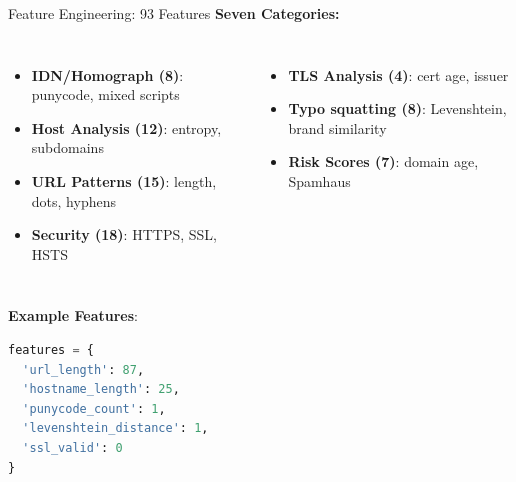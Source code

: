 \documentclass[10pt, aspectratio=169]{beamer}
\begin{document}
\begin{frame}{Feature Engineering: 93 Features}
    \textbf{Seven Categories:}
    \begin{columns}[T]
        \begin{itemize}
            \item \textbf{IDN/Homograph (8)}: punycode, mixed scripts
            \item \textbf{Host Analysis (12)}: entropy, subdomains
            \item \textbf{URL Patterns (15)}: length, dots, hyphens
            \item \textbf{Security (18)}: HTTPS, SSL, HSTS
        \end{itemize}
        \begin{itemize}
            \item \textbf{TLS Analysis (4)}: cert age, issuer
            \item \textbf{Typo squatting (8)}: Levenshtein, brand similarity
            \item \textbf{Risk Scores (7)}: domain age, Spamhaus
        \end{itemize}
    \end{columns}
    
    \vspace{3mm}
    \textbf{Example Features}:
    \begin{lstlisting}[language=Python, basicstyle=\ttfamily\tiny]
features = {
  'url_length': 87,
  'hostname_length': 25,
  'punycode_count': 1,
  'levenshtein_distance': 1,
  'ssl_valid': 0
}
    \end{lstlisting}
\end{frame}
\end{document}
